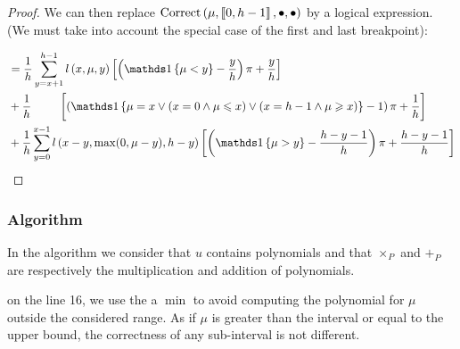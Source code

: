 \begin{proof}
We can then replace $\text{Correct}\left(\mu, \left\llbracket0, h - 1\right\rrbracket, \bullet, \bullet\right)$ by a logical expression. (We must take into account the special case of the first and last breakpoint):

\begin{align}
    \begin{aligned}
        &=\frac{1}{h} \sum_{y = x + 1}^{h - 1} \bosl{x}{\mu}{y} \left[ \left( \indickronecker{\mu < y} - \frac{y}{h} \right) \pi + \frac{y}{h} \right] \\
        &+\frac{1}{h} \ \qquad \left[ \left( \indickronecker{\mu = x \lor (x = 0 \land \mu \leq x) \lor (x = h - 1 \land \mu \geq x)} - 1 \right) \pi +  \frac{1}{h} \right] \\
        &+\frac{1}{h} \sum_{y = 0}^{x - 1}\bosl{x - y}{\max(0, \mu - y)}{h - y}    \left[ \left( \indickronecker{\mu > y} - \frac{h - y - 1}{h} \right) \pi + \frac{h - y - 1}{h} \right]
    \end{aligned} \\
\end{align}
\end{proof}


\subsubsection{Algorithm}

In the algorithm we consider that $u$ contains polynomials and that $\times_P$ and $+_P$ are respectively the multiplication and addition of polynomials.

on the line 16, we use the a $\min$ to avoid computing the polynomial for $\mu$ outside the considered range. As if $\mu$ is greater than the interval or equal to the upper bound, the correctness of any sub-interval is not different.

